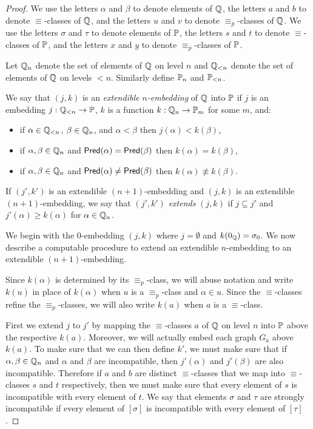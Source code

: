 \begin{proof}
We use the letters $\alpha$ and $\beta$ to denote elements of $\mathbb{Q}$,
the letters $a$ and $b$ to denote $\equiv$-classes of $\mathbb{Q}$,
and the letters $u$ and $v$ to denote $\equiv_p$-classes of $\mathbb{Q}$.
We use the letters $\sigma$ and $\tau$ to denote elements of $\mathbb{P}$,
the letters $s$ and $t$ to denote $\equiv$-classes of $\mathbb{P}$,
and the letters $x$ and $y$ to denote $\equiv_p$-classes of $\mathbb{P}$.

Let $\mathbb{Q}_n$ denote the set of elements of $\mathbb{Q}$ on level $n$ and $\mathbb{Q}_{<n}$
denote the set of elements of $\mathbb{Q}$ on levels $<n$.
Similarly define $\mathbb{P}_{n}$ and $\mathbb{P}_{<n}$.

We say that $(j,k)$ is
an \textit{extendible $n$-embedding} of $\mathbb{Q}$ into $\mathbb{P}$ if
$j$ is an embedding $j:\mathbb{Q}_{<n}\rightarrow \mathbb{P}$,
$k$ is a function $k:\mathbb{Q}_n\rightarrow \mathbb{P}_m$ for some $m$, and:
\begin{itemize}
\item if $\alpha\in\mathbb{Q}_{<n}$, $\beta\in\mathbb{Q}_{n}$, and $\alpha<\beta$ then $j(\alpha)< k(\beta)$,
\item if $\alpha,\beta\in\mathbb{Q}_{n}$ and $\mathsf{Pred}(\alpha)=\mathsf{Pred}(\beta)$ then $k(\alpha)=k(\beta)$,
\item if $\alpha,\beta\in\mathbb{Q}_{n}$ and $\mathsf{Pred}(\alpha)\neq \mathsf{Pred}(\beta)$ then $k(\alpha)\not\equiv k(\beta)$.
\end{itemize}
If $(j',k')$ is an extendible $(n+1)$-embedding and
$(j,k)$ is an extendible $(n+1)$-embedding,
we say that $(j',k')$ \textit{extends} $(j,k)$ if
$j\subseteq j'$ and $j'(\alpha)\geq k(\alpha)$ for $\alpha\in\mathbb{Q}_n$.

We begin with the $0$-embedding $(j,k)$ where $j=\emptyset$ and $k(0_{\mathbb{Q}})=\sigma_0$.
We now describe a computable procedure to extend an extendible $n$-embedding to an extendible $(n+1)$-embedding.

Since $k(\alpha)$ is determined by its $\equiv_p$-class, we will abuse notation and
write $k(u)$ in place of $k(\alpha)$ when $u$ is a $\equiv_p$-class and $\alpha\in u$.
Since the $\equiv$-classes refine the $\equiv_p$-classes,
we will also write $k(a)$ when $a$ is a $\equiv$-class.

First we extend $j$ to $j'$ by mapping the $\equiv$-classes $a$
of $\mathbb{Q}$ on level $n$ into $\mathbb{P}$ above the respective $k(a)$.
Moreover, we will actually embed each graph $G_a$ above $k(a)$.
To make sure that we can then define $k'$,
we must make sure that if $\alpha,\beta\in\mathbb{Q}_n$ and
$\alpha$ and $\beta$ are incompatible, then
$j'(\alpha)$ and $j'(\beta)$ are also incompatible.
Therefore if $a$ and $b$ are distinct $\equiv$-classes
that we map into $\equiv$-classes $s$ and $t$ respectively,
then we must make sure that every element of $s$
is incompatible with every element of $t$.
We say that elements $\sigma$ and $\tau$
are strongly incompatible if every element of $[\sigma]$
is incompatible with every element of $[\tau]$.


\end{proof}

